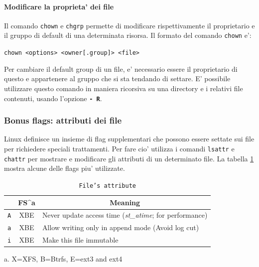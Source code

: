 \paragraph{Modificare la proprieta' dei file}
 Il comando \texttt{chown} e \texttt{chgrp} permette di modificare rispettivamente il proprietario e il gruppo di default di una determinata risorsa.
Il formato del comando \texttt{chown} e':
\begin{center}
	\texttt{chown <options> <owner[.group]> <file>}
\end{center}
Per cambiare il default group di un file, e' necessario essere il proprietario di questo e appartenere al gruppo che si sta tendando di settare. E' possibile utilizzare questo comando in maniera ricorsiva su una directory e i relativi file contenuti, usando l'opzione \texttt{\textbf{- R}}.

\subsubsection{Bonus flags: attributi dei file}
Linux definisce un insieme di flag supplementari che possono essere settate sui file per richiedere speciali trattamenti. Per fare cio' utilizza i comandi \texttt{lsattr} e \texttt{chattr} per mostrare e modificare gli attributi di un determinato file. La tabella \ref{fileattributes} mostra alcune delle flags piu' utilizzate.

\begin{table}[H]
\centering
\begin{tabular}[H]{ccp{13cm}}
\hline
\rowcolor[HTML]{C0C0C0} 
\multicolumn{1}{c|}{\cellcolor[HTML]{C0C0C0}\textbf{Flag}} &
\multicolumn{1}{c|}{\cellcolor[HTML]{C0C0C0}\textbf{FS^{a}}} &
\multicolumn{1}{c}{\cellcolor[HTML]{C0C0C0}\textbf{Meaning}} \\ \hline
\texttt{A}& XBE & Never update access time (\emph{st\_atime}; for performance)\\ \hline
\texttt{a}& XBE & Allow writing only in append mode (Avoid log cut)\\ \hline
\texttt{i}& XBE & Make this file immutable \\ \hline
\end{tabular}
\caption{\texttt{File's attribute}}\label{fileattributes}
\end{table}
a. X=XFS, B=Btrfs, E=ext3 and ext4

